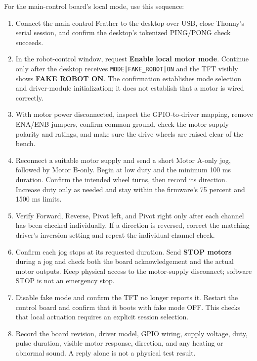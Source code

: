 \documentclass{article}
\begin{document}
For the main-control board's local mode, use this sequence:
\begin{enumerate}
    \item Connect the main-control Feather to the desktop over USB, close Thonny's serial session, and confirm the desktop's tokenized PING/PONG check succeeds.
    \item In the robot-control window, request \textbf{Enable local motor mode}. Continue only after the desktop receives \texttt{MODE|FAKE\_ROBOT|ON} and the TFT visibly shows \textbf{FAKE ROBOT ON}. The confirmation establishes mode selection and driver-module initialization; it does not establish that a motor is wired correctly.
    \item With motor power disconnected, inspect the GPIO-to-driver mapping, remove ENA/ENB jumpers, confirm common ground, check the motor supply polarity and ratings, and make sure the drive wheels are raised clear of the bench.
    \item Reconnect a suitable motor supply and send a short Motor A-only jog, followed by Motor B-only. Begin at low duty and the minimum 100 ms duration. Confirm the intended wheel turns, then record its direction. Increase duty only as needed and stay within the firmware's 75 percent and 1500 ms limits.
    \item Verify Forward, Reverse, Pivot left, and Pivot right only after each channel has been checked individually. If a direction is reversed, correct the matching driver's inversion setting and repeat the individual-channel check.
    \item Confirm each jog stops at its requested duration. Send \textbf{STOP motors} during a jog and check both the board acknowledgement and the actual motor outputs. Keep physical access to the motor-supply disconnect; software STOP is not an emergency stop.
    \item Disable fake mode and confirm the TFT no longer reports it. Restart the control board and confirm that it boots with fake mode OFF. This checks that local actuation requires an explicit session selection.
    \item Record the board revision, driver model, GPIO wiring, supply voltage, duty, pulse duration, visible motor response, direction, and any heating or abnormal sound. A reply alone is not a physical test result.
\end{enumerate}
\end{document}
